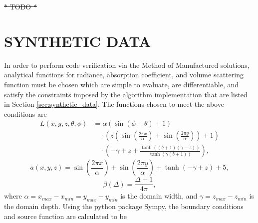 \documentclass[ms,cpyr,lof,lot]{uathesis}
\providecommand{\DIFdel}[1]{{\protect\color{red}\sout{#1}}}                      %
\providecommand{\DIFdelend}{} %
\DeclareRobustCommand{\DIFdelend}{\DIFOaddend \let\includegraphics\DIFOincludegraphics} %
\begin{document}
\DIFdel{* TODO *
}%

\DIFdelend \chapter{SYNTHETIC DATA}
\label{chap:synthetic_data}

In order to perform code verification via the Method of Manufactured solutions, analytical functions for radiance, absorption coefficient, and volume scattering function must be chosen which are simple to evaluate, are differentiable, and satisfy the constraints imposed by the algorithm implementation that are listed in Section \ref{sec:synthetic_data}.
The functions chosen to meet the above conditions are
\begin{align}
  L(x, y, z, \theta, \phi) &=
    \alpha \left(\sin{\left (\phi + \theta \right )} + 1\right) \nonumber\\
    &\quad\cdot \left(z \left(\sin{\left (\frac{2 \pi x}{\alpha} \right )} + \sin{\left (\frac{2 \pi y}{\alpha} \right )}\right) + 1\right) \nonumber\\
    &\quad\cdot \left(- \gamma + z + \frac{\tanh{\left (\left(b + 1\right) \left(\gamma - z\right) \right )}}{\tanh{\left (\gamma \left(b + 1\right) \right )}}\right),
  \label{eqn:mms_sol_expr}
\end{align}
\begin{equation}
  a(x, y, z) = \sin{\left (\frac{2 \pi x}{\alpha} \right )} + \sin{\left (\frac{2 \pi y}{\alpha} \right )} + \tanh{\left (- \gamma + z \right )} + 5,
  \label{eqn:mms_abs_expr}
\end{equation}
\begin{equation}
  \beta(\Delta) = \frac{\Delta + 1}{4 \pi},
  \label{eqn:mms_vsf_expr}
\end{equation}
where $\alpha=x_{max}-x_{min}=y_{max}-y_{min}$ is the domain width, and $\gamma=z_{max}-z_{min}$ is the domain depth.
Using the python package Sympy, the boundary conditions and source function are calculated to be
\end{document}
